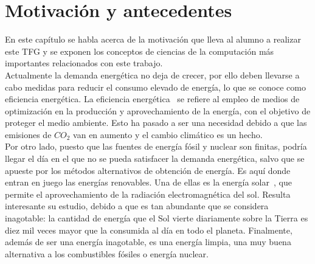 \chapter{Motivación y antecedentes}
\label{cap:Antecedentes}
En este capítulo se habla acerca de la motivación que lleva al alumno a realizar este \gls{TFG} y se exponen los conceptos de ciencias de la computación más importantes relacionados con este trabajo.\\

Actualmente la demanda energética no deja de crecer, por ello deben llevarse a cabo medidas para reducir el consumo elevado de energía, lo que se conoce como eficiencia energética. La eficiencia energética~\cite{GarSa12} se refiere al empleo de medios de optimización en la producción y aprovechamiento de la energía, con el objetivo de proteger el medio ambiente. Esto ha pasado a ser una necesidad debido a que las emisiones de $ CO_{2} $ van en aumento y el cambio climático es un hecho.\\

Por otro lado, puesto que las fuentes de energía fósil y nuclear son finitas, podría llegar el día en el que no se pueda satisfacer la demanda energética, salvo que se apueste por los métodos alternativos de obtención de energía. Es aquí donde entran en juego las energías renovables. Una de ellas es la energía solar~\cite{Perp12}, que permite el aprovechamiento de la radiación electromagnética del sol. Resulta interesante su estudio, debido a que es tan abundante que se considera inagotable: la cantidad de energía que el Sol vierte diariamente sobre la Tierra es diez mil veces mayor que la consumida al día en todo el planeta. Finalmente, además de ser una energía inagotable, es una energía limpia, una muy buena alternativa a los combustibles fósiles o energía nuclear. \\

